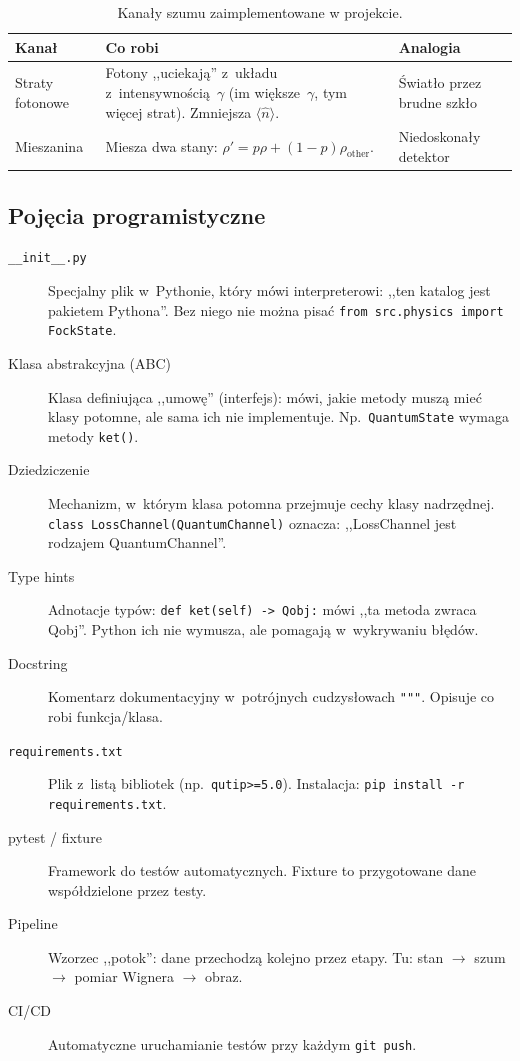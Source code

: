 \documentclass[12pt,a4paper]{article}
\begin{document}
\begin{table}[htbp]
\centering
\caption{Kanały szumu zaimplementowane w projekcie.}
\label{tab:kanaly}
\begin{tabular}{@{}lp{6cm}p{5cm}@{}}
\toprule
\textbf{Kanał} & \textbf{Co robi} & \textbf{Analogia} \\
\midrule
Straty fotonowe & Fotony ,,uciekają'' z~układu z~intensywnością~$\gamma$ (im większe~$\gamma$, tym więcej strat). Zmniejsza $\langle\hat{n}\rangle$. & Światło przez brudne szkło \\
\addlinespace
Mieszanina & Miesza dwa stany: $\rho' = p\rho + (1-p)\rho_\mathrm{other}$. & Niedoskonały detektor \\
\bottomrule
\end{tabular}
\end{table}

\subsection{Pojęcia programistyczne}

\begin{description}
    \item[\texttt{\_\_init\_\_.py}] Specjalny plik w~Pythonie, który mówi interpreterowi: ,,ten katalog jest pakietem Pythona''. Bez niego nie można pisać \texttt{from src.physics import FockState}.
    \item[Klasa abstrakcyjna (ABC)] Klasa definiująca ,,umowę'' (interfejs): mówi, jakie metody muszą mieć klasy potomne, ale sama ich nie implementuje. Np.~\texttt{QuantumState} wymaga metody \texttt{ket()}.
    \item[Dziedziczenie] Mechanizm, w~którym klasa potomna przejmuje cechy klasy nadrzędnej. \texttt{class LossChannel(QuantumChannel)} oznacza: ,,LossChannel jest rodzajem QuantumChannel''.
    \item[Type hints] Adnotacje typów: \texttt{def ket(self) -> Qobj:} mówi ,,ta metoda zwraca Qobj''. Python ich nie wymusza, ale pomagają w~wykrywaniu błędów.
    \item[Docstring] Komentarz dokumentacyjny w~potrójnych cudzysłowach \texttt{"""}. Opisuje co robi funkcja/klasa.
    \item[\texttt{requirements.txt}] Plik z~listą bibliotek (np.~\texttt{qutip>=5.0}). Instalacja: \texttt{pip install -r requirements.txt}.
    \item[pytest / fixture] Framework do testów automatycznych. Fixture to przygotowane dane współdzielone przez testy.
    \item[Pipeline] Wzorzec ,,potok'': dane przechodzą kolejno przez etapy. Tu: stan $\to$ szum $\to$ pomiar Wignera $\to$ obraz.
    \item[CI/CD] Automatyczne uruchamianie testów przy każdym \texttt{git push}.
\end{description}
\end{document}
